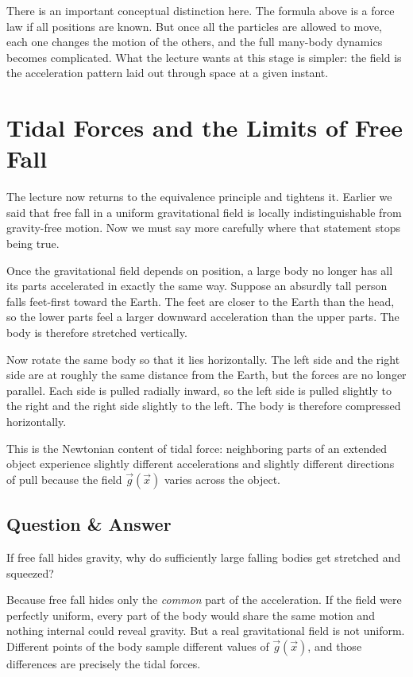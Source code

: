 There is an important conceptual distinction here. The formula above is a force law if all positions are known. But once all the particles are allowed to move, each one changes the motion of the others, and the full many-body dynamics becomes complicated. What the lecture wants at this stage is simpler: the field is the acceleration pattern laid out through space at a given instant.

\section{Tidal Forces and the Limits of Free Fall}

The lecture now returns to the equivalence principle and tightens it. Earlier we said that free fall in a uniform gravitational field is locally indistinguishable from gravity-free motion. Now we must say more carefully where that statement stops being true.

Once the gravitational field depends on position, a large body no longer has all its parts accelerated in exactly the same way. Suppose an absurdly tall person falls feet-first toward the Earth. The feet are closer to the Earth than the head, so the lower parts feel a larger downward acceleration than the upper parts. The body is therefore stretched vertically.

Now rotate the same body so that it lies horizontally. The left side and the right side are at roughly the same distance from the Earth, but the forces are no longer parallel. Each side is pulled radially inward, so the left side is pulled slightly to the right and the right side slightly to the left. The body is therefore compressed horizontally.

This is the Newtonian content of tidal force: neighboring parts of an extended object experience slightly different accelerations and slightly different directions of pull because the field \(\vec g(\vec x)\) varies across the object.

\subsection{Question \& Answer}

If free fall hides gravity, why do sufficiently large falling bodies get stretched and squeezed?

Because free fall hides only the \emph{common} part of the acceleration. If the field were perfectly uniform, every part of the body would share the same motion and nothing internal could reveal gravity. But a real gravitational field is not uniform. Different points of the body sample different values of \(\vec g(\vec x)\), and those differences are precisely the tidal forces.

